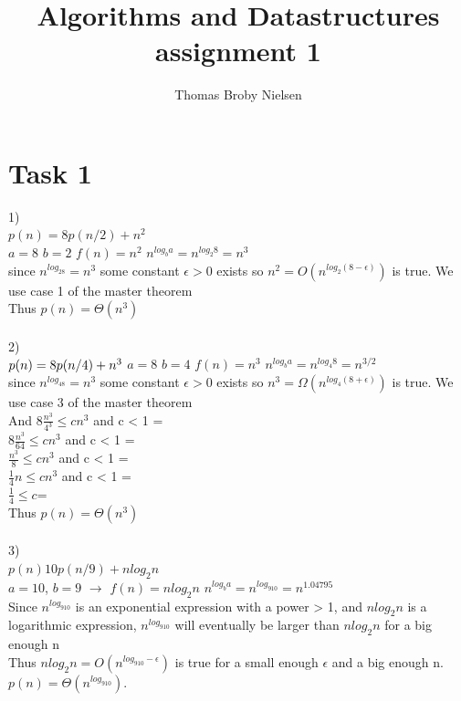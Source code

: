 \documentclass[12pt]{article}
\title{Algorithms and Datastructures assignment 1}
\author{Thomas Broby Nielsen}
\begin{document}
\maketitle

\tableofcontents

\pagebreak
\section{Task 1}
1)
\\
$
p(n)=8p(n/2)+n^{2}
$\\
$a=8$ $b=2$ $f(n)=n^{2}$ $n^{log_{b}a}=n^{log_{2}8}=n^3$\\
since $n^{log_28}=n^3$ some constant $\epsilon > 0 $ exists so $n^2=O(n^{log_2(8-\epsilon)})$ is true. We use case 1 of the master theorem\\
Thus $p(n)=\Theta (n^3)$\\
\\
2)
\\
$p(n)=8p(n/4)+n^{3}\\$
$a=8$ $b=4$ $f(n)=n^{3}$ $n^{log_{b}a}=n^{log_{4}8}=n^{3/2}$\\
since $n^{log_48}=n^3$ some constant $\epsilon > 0$ exists so $n^3=\Omega(n^{log_4(8+\epsilon)})$  is true. We use case 3 of the master theorem\\
And $8 \frac {n^3}{4^3} \leq cn^3$ and c < 1 =\\
 $8 \frac {n^3}{64} \leq cn^3$ and c < 1 =\\
 $ \frac {n^3}{8} \leq cn^3$ and c < 1 =\\
 $ \frac {1}{4}n \leq cn^3$ and c < 1 =\\
 $  \frac {1}{4} \leq c$=\\
Thus $p(n)=\Theta(n^3)$\\
\\
3)
\\
$p(n)10p(n/9)+nlog_2n$
\\
$a=10$, $b=9$ $\rightarrow$ $f(n)=nlog_2n$ $n^{log_{b}a}=n^{log_910}=n^{1.04795}$
\\
Since $n^{log_910}$ is an exponential expression with a power > 1, and $n log_2 n$ is a logarithmic expression, $n^{log_910}$ will eventually be larger than $n log_2 n$ for a big enough n
\\
Thus $n log_2 n = O(n^{log_910-\epsilon})$ is true for a small enough $\epsilon$ and a big enough n.
$p(n)=\Theta (n^{log_910}).$
\newpage
\end{document}
